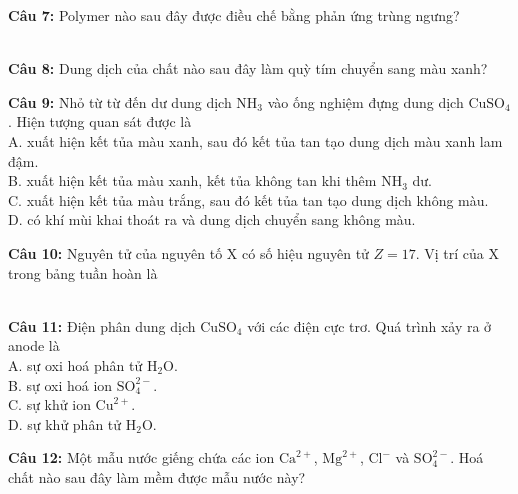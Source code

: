 \documentclass[12pt,a4paper]{article}
\begin{document}
\noindent \textbf{Câu 7:} Polymer nào sau đây được điều chế bằng phản ứng trùng ngưng?\\
\noindent{}\\
\noindent{}

\noindent \textbf{Câu 8:} Dung dịch của chất nào sau đây làm quỳ tím chuyển sang màu xanh?\\
\noindent{}

\noindent \textbf{Câu 9:} Nhỏ từ từ đến dư dung dịch $\text{NH}_3$ vào ống nghiệm đựng dung dịch $\text{CuSO}_4$. Hiện tượng quan sát được là\\
\noindent A. xuất hiện kết tủa màu xanh, sau đó kết tủa tan tạo dung dịch màu xanh lam đậm.\\
\noindent B. xuất hiện kết tủa màu xanh, kết tủa không tan khi thêm $\text{NH}_3$ dư.\\
\noindent C. xuất hiện kết tủa màu trắng, sau đó kết tủa tan tạo dung dịch không màu.\\
\noindent D. có khí mùi khai thoát ra và dung dịch chuyển sang không màu.

\noindent \textbf{Câu 10:} Nguyên tử của nguyên tố X có số hiệu nguyên tử $Z = 17$. Vị trí của X trong bảng tuần hoàn là\\
\noindent{}\\
\noindent{}

\noindent \textbf{Câu 11:} Điện phân dung dịch $\text{CuSO}_4$ với các điện cực trơ. Quá trình xảy ra ở anode là\\
\noindent A. sự oxi hoá phân tử $\text{H}_2\text{O}$.\\
\noindent B. sự oxi hoá ion $\text{SO}_4^{2-}$.\\
\noindent C. sự khử ion $\text{Cu}^{2+}$.\\
\noindent D. sự khử phân tử $\text{H}_2\text{O}$.

\noindent \textbf{Câu 12:} Một mẫu nước giếng chứa các ion $\text{Ca}^{2+}$, $\text{Mg}^{2+}$, $\text{Cl}^{-}$ và $\text{SO}_4^{2-}$. Hoá chất nào sau đây làm mềm được mẫu nước này?\\
\noindent{}\\
\noindent{}
\end{document}
